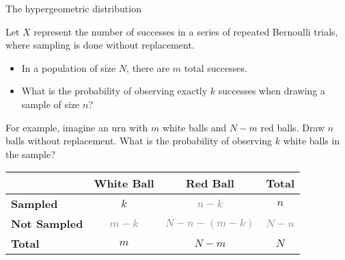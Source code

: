 \documentclass[
  ignorenonframetext,
  aspectratio=169]{beamer}
\begin{document}
\begin{frame}{The hypergeometric distribution}
\protect\hypertarget{the-hypergeometric-distribution}{}
\small

Let \(X\) represent the number of successes in a series of repeated
Bernoulli trials, where sampling is done without replacement.

\begin{itemize}
\item
  In a population of size \(N\), there are \(m\) total successes.
\item
  What is the probability of observing exactly \(k\) successes when
  drawing a sample of size \(n\)?
\end{itemize}

For example, imagine an urn with \(m\) white balls and \(N - m\) red
balls. Draw \(n\) balls without replacement. What is the probability of
observing \(k\) white balls in the sample?

\begin{table}[h!]
\begin{center}
\begin{tabular}{l|cc|c} 
   & \textbf{White Ball} & \textbf{Red Ball} & \textbf{Total}\\ \hline
  \textbf{Sampled} & $k$ & \textcolor{gray}{$n - k$}  & $n$  \\
  \textbf{Not Sampled} & \textcolor{gray}{$m - k$} & \textcolor{gray}{$N - n - (m - k)$} & \textcolor{gray}{$N - n$} \\ \hline
  \textbf{Total} & $m$ & $N - m$ & $N$  \\ 
\end{tabular}\\
\end{center}
\end{table}
\end{frame}
\end{document}
